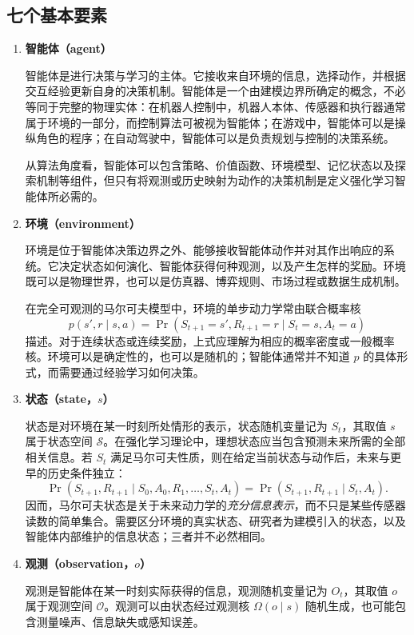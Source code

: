 \documentclass[UTF8,12pt,a4paper,fontset=fandol]{ctexbook}
\begin{document}
\subsection{七个基本要素}


\begin{enumerate}[label=\textbf{\arabic*.},leftmargin=3em]
  \item \textbf{智能体（agent）}


  智能体是进行决策与学习的主体。它接收来自环境的信息，选择动作，并根据交互经验更新自身的决策机制。智能体是一个由建模边界所确定的概念，不必等同于完整的物理实体：在机器人控制中，机器人本体、传感器和执行器通常属于环境的一部分，而控制算法可被视为智能体；在游戏中，智能体可以是操纵角色的程序；在自动驾驶中，智能体可以是负责规划与控制的决策系统。


  从算法角度看，智能体可以包含策略、价值函数、环境模型、记忆状态以及探索机制等组件，但只有将观测或历史映射为动作的决策机制是定义强化学习智能体所必需的。


  \item \textbf{环境（environment）}


  环境是位于智能体决策边界之外、能够接收智能体动作并对其作出响应的系统。它决定状态如何演化、智能体获得何种观测，以及产生怎样的奖励。环境既可以是物理世界，也可以是仿真器、博弈规则、市场过程或数据生成机制。


  在完全可观测的马尔可夫模型中，环境的单步动力学常由联合概率核
  \[
    p(s',r\mid s,a)
    =\Pr\!\left(S_{t+1}=s',R_{t+1}=r\mid S_t=s,A_t=a\right)
  \]
  描述。对于连续状态或连续奖励，上式应理解为相应的概率密度或一般概率核。环境可以是确定性的，也可以是随机的；智能体通常并不知道 $p$ 的具体形式，而需要通过经验学习如何决策。


  \item \textbf{状态（state，$s$）}


  状态是对环境在某一时刻所处情形的表示，状态随机变量记为 $S_t$，其取值 $s$ 属于状态空间 $\mathcal{S}$。在强化学习理论中，理想状态应当包含预测未来所需的全部相关信息。若 $S_t$ 满足马尔可夫性质，则在给定当前状态与动作后，未来与更早的历史条件独立：
  \[
    \Pr(S_{t+1},R_{t+1}\mid S_0,A_0,R_1,\ldots,S_t,A_t)
    =\Pr(S_{t+1},R_{t+1}\mid S_t,A_t).
  \]
  因而，马尔可夫状态是关于未来动力学的\emph{充分信息表示}，而不只是某些传感器读数的简单集合。需要区分环境的真实状态、研究者为建模引入的状态，以及智能体内部维护的信息状态；三者并不必然相同。


  \item \textbf{观测（observation，$o$）}


  观测是智能体在某一时刻实际获得的信息，观测随机变量记为 $O_t$，其取值 $o$ 属于观测空间 $\mathcal{O}$。观测可以由状态经过观测核 $\Omega(o\mid s)$ 随机生成，也可能包含测量噪声、信息缺失或感知误差。



\end{enumerate}
\end{document}
